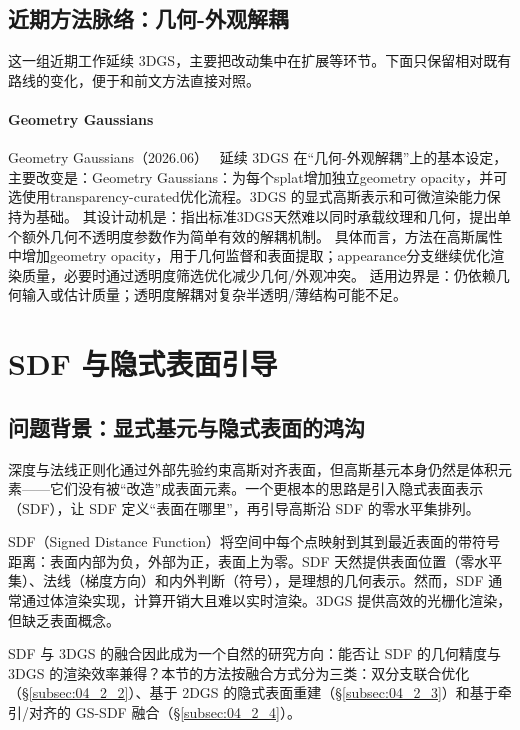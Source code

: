 
\subsection{近期方法脉络：几何-外观解耦}

这一组近期工作延续 3DGS，主要把改动集中在扩展等环节。下面只保留相对既有路线的变化，便于和前文方法直接对照。

\paragraph{Geometry Gaussians}
Geometry Gaussians（2026.06）~\cite{2606_05124} 延续 3DGS 在“几何-外观解耦”上的基本设定，主要改变是：Geometry Gaussians：为每个splat增加独立geometry opacity，并可选使用transparency-curated优化流程。3DGS 的显式高斯表示和可微渲染能力保持为基础。
其设计动机是：指出标准3DGS天然难以同时承载纹理和几何，提出单个额外几何不透明度参数作为简单有效的解耦机制。
具体而言，方法在高斯属性中增加geometry opacity，用于几何监督和表面提取；appearance分支继续优化渲染质量，必要时通过透明度筛选优化减少几何/外观冲突。
适用边界是：仍依赖几何输入或估计质量；透明度解耦对复杂半透明/薄结构可能不足。
\section{SDF 与隐式表面引导}
\label{sec:04_2}

\subsection{问题背景：显式基元与隐式表面的鸿沟}

深度与法线正则化通过外部先验约束高斯对齐表面，但高斯基元本身仍然是体积元素——它们没有被“改造”成表面元素。一个更根本的思路是引入隐式表面表示（SDF），让 SDF 定义“表面在哪里”，再引导高斯沿 SDF 的零水平集排列。

SDF（Signed Distance Function）将空间中每个点映射到其到最近表面的带符号距离：表面内部为负，外部为正，表面上为零。SDF 天然提供表面位置（零水平集）、法线（梯度方向）和内外判断（符号），是理想的几何表示。然而，SDF 通常通过体渲染实现，计算开销大且难以实时渲染。3DGS 提供高效的光栅化渲染，但缺乏表面概念。

SDF 与 3DGS 的融合因此成为一个自然的研究方向：能否让 SDF 的几何精度与 3DGS 的渲染效率兼得？本节的方法按融合方式分为三类：双分支联合优化（\S\ref{subsec:04_2_2}）、基于 2DGS 的隐式表面重建（\S\ref{subsec:04_2_3}）和基于牵引/对齐的 GS-SDF 融合（\S\ref{subsec:04_2_4}）。

